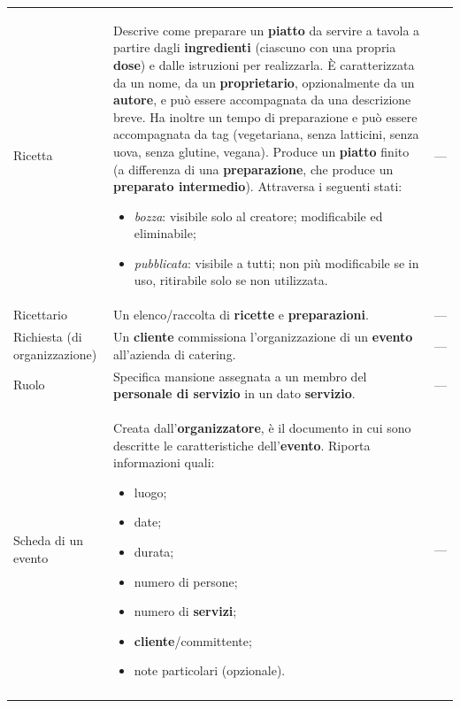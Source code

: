 \begin{longtable}{L{3.5cm} L{8.5cm} L{3cm}}
Ricetta
& Descrive come preparare un \textbf{piatto} da servire a tavola a partire
  dagli \textbf{ingredienti} (ciascuno con una propria \textbf{dose}) e dalle
  istruzioni per realizzarla. È caratterizzata da un nome, da un
  \textbf{proprietario}, opzionalmente da un \textbf{autore}, e può essere
  accompagnata da una descrizione breve. Ha inoltre un tempo di preparazione
  e può essere accompagnata da tag (vegetariana, senza latticini, senza uova,
  senza glutine, vegana).
  Produce un \textbf{piatto} finito (a differenza di una \textbf{preparazione},
  che produce un \textbf{preparato intermedio}).
  Attraversa i seguenti stati:
  \begin{itemize}[nosep,leftmargin=*]
    \item \emph{bozza}: visibile solo al creatore; modificabile ed
          eliminabile;
    \item \emph{pubblicata}: visibile a tutti; non più modificabile se in
          uso, ritirabile solo se non utilizzata.
  \end{itemize}
& — \\
\addlinespace

Ricettario
& Un elenco/raccolta di \textbf{ricette} e \textbf{preparazioni}.
& — \\
\addlinespace

Richiesta (di organizzazione)
& Un \textbf{cliente} commissiona l'organizzazione di un \textbf{evento}
  all'azienda di catering.
& — \\
\addlinespace

Ruolo
& Specifica mansione assegnata a un membro del \textbf{personale di servizio}
  in un dato \textbf{servizio}.
& — \\
\addlinespace

Scheda di un evento
& Creata dall'\textbf{organizzatore}, è il documento in cui sono descritte le
  caratteristiche dell'\textbf{evento}. Riporta informazioni quali:
  \begin{itemize}[nosep,leftmargin=*]
    \item luogo;
    \item date;
    \item durata;
    \item numero di persone;
    \item numero di \textbf{servizi};
    \item \textbf{cliente}/committente;
    \item note particolari (opzionale).
  \end{itemize}
& — \\
\addlinespace


\end{longtable}
